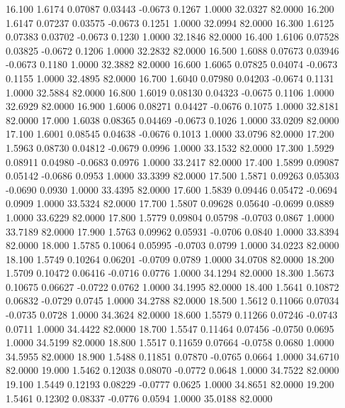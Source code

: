   16.100   1.6174   0.07087   0.03443  -0.0673   0.1267   1.0000  32.0327  82.0000
  16.200   1.6147   0.07237   0.03575  -0.0673   0.1251   1.0000  32.0994  82.0000
  16.300   1.6125   0.07383   0.03702  -0.0673   0.1230   1.0000  32.1846  82.0000
  16.400   1.6106   0.07528   0.03825  -0.0672   0.1206   1.0000  32.2832  82.0000
  16.500   1.6088   0.07673   0.03946  -0.0673   0.1180   1.0000  32.3882  82.0000
  16.600   1.6065   0.07825   0.04074  -0.0673   0.1155   1.0000  32.4895  82.0000
  16.700   1.6040   0.07980   0.04203  -0.0674   0.1131   1.0000  32.5884  82.0000
  16.800   1.6019   0.08130   0.04323  -0.0675   0.1106   1.0000  32.6929  82.0000
  16.900   1.6006   0.08271   0.04427  -0.0676   0.1075   1.0000  32.8181  82.0000
  17.000   1.6038   0.08365   0.04469  -0.0673   0.1026   1.0000  33.0209  82.0000
  17.100   1.6001   0.08545   0.04638  -0.0676   0.1013   1.0000  33.0796  82.0000
  17.200   1.5963   0.08730   0.04812  -0.0679   0.0996   1.0000  33.1532  82.0000
  17.300   1.5929   0.08911   0.04980  -0.0683   0.0976   1.0000  33.2417  82.0000
  17.400   1.5899   0.09087   0.05142  -0.0686   0.0953   1.0000  33.3399  82.0000
  17.500   1.5871   0.09263   0.05303  -0.0690   0.0930   1.0000  33.4395  82.0000
  17.600   1.5839   0.09446   0.05472  -0.0694   0.0909   1.0000  33.5324  82.0000
  17.700   1.5807   0.09628   0.05640  -0.0699   0.0889   1.0000  33.6229  82.0000
  17.800   1.5779   0.09804   0.05798  -0.0703   0.0867   1.0000  33.7189  82.0000
  17.900   1.5763   0.09962   0.05931  -0.0706   0.0840   1.0000  33.8394  82.0000
  18.000   1.5785   0.10064   0.05995  -0.0703   0.0799   1.0000  34.0223  82.0000
  18.100   1.5749   0.10264   0.06201  -0.0709   0.0789   1.0000  34.0708  82.0000
  18.200   1.5709   0.10472   0.06416  -0.0716   0.0776   1.0000  34.1294  82.0000
  18.300   1.5673   0.10675   0.06627  -0.0722   0.0762   1.0000  34.1995  82.0000
  18.400   1.5641   0.10872   0.06832  -0.0729   0.0745   1.0000  34.2788  82.0000
  18.500   1.5612   0.11066   0.07034  -0.0735   0.0728   1.0000  34.3624  82.0000
  18.600   1.5579   0.11266   0.07246  -0.0743   0.0711   1.0000  34.4422  82.0000
  18.700   1.5547   0.11464   0.07456  -0.0750   0.0695   1.0000  34.5199  82.0000
  18.800   1.5517   0.11659   0.07664  -0.0758   0.0680   1.0000  34.5955  82.0000
  18.900   1.5488   0.11851   0.07870  -0.0765   0.0664   1.0000  34.6710  82.0000
  19.000   1.5462   0.12038   0.08070  -0.0772   0.0648   1.0000  34.7522  82.0000
  19.100   1.5449   0.12193   0.08229  -0.0777   0.0625   1.0000  34.8651  82.0000
  19.200   1.5461   0.12302   0.08337  -0.0776   0.0594   1.0000  35.0188  82.0000
